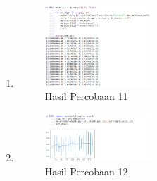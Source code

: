 \begin{enumerate}
		\item \hfill \break 
		\begin{figure}[H]
			\includegraphics[width=4cm]{figures/1174043/chapter2/hasil11.png}
			\centering
			\caption{Hasil Percobaan 11}
		\end{figure}
		
		\item \hfill \break 
		\begin{figure}[H]
			\includegraphics[width=4cm]{figures/1174043/chapter2/hasil12.png}
			\centering
			\caption{Hasil Percobaan 12}
		\end{figure}
	\end{enumerate}